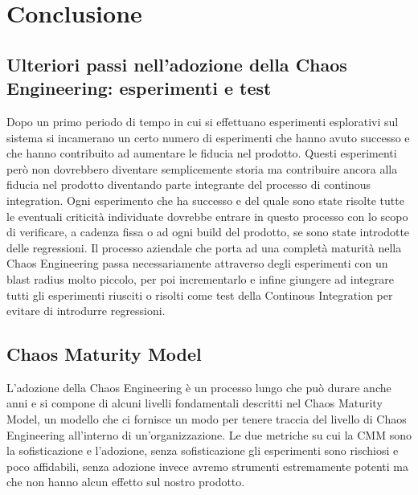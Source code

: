 
\chapter{Conclusione}

\section{Ulteriori passi nell'adozione della Chaos Engineering: esperimenti e test}
Dopo un primo periodo di tempo in cui si effettuano esperimenti esplorativi sul sistema si incamerano un certo numero di esperimenti che hanno avuto successo e che hanno contribuito ad aumentare le fiducia nel prodotto.
Questi esperimenti però non dovrebbero diventare semplicemente storia ma contribuire ancora alla fiducia nel prodotto diventando parte integrante del processo di continous integration.
Ogni esperimento che ha successo e del quale sono state risolte tutte le eventuali criticità individuate dovrebbe entrare in questo processo con lo scopo di verificare, a cadenza fissa o ad ogni build del prodotto, se sono state introdotte delle regressioni.
Il processo aziendale che porta ad una completà maturità nella Chaos Engineering passa necessariamente attraverso degli esperimenti con un blast radius molto piccolo, per poi incrementarlo e infine giungere ad integrare tutti gli esperimenti riusciti o risolti come test della Continous Integration per evitare di introdurre regressioni.


\section{Chaos Maturity Model}
L'adozione della Chaos Engineering è un processo lungo che può durare anche anni e si compone di alcuni livelli fondamentali descritti nel Chaos Maturity Model, un modello che ci fornisce un modo per tenere traccia del livello di Chaos Engineering all'interno di un'organizzazione.
Le due metriche su cui la CMM sono la sofisticazione e l'adozione, senza sofisticazione gli esperimenti sono rischiosi e poco affidabili, senza adozione invece avremo strumenti estremamente potenti ma che non hanno alcun effetto sul nostro prodotto.

